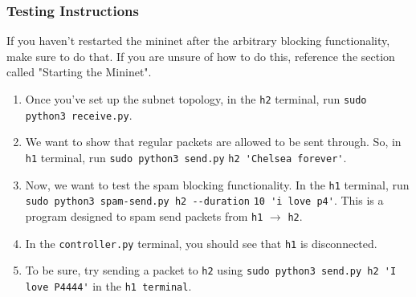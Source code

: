 \subsubsection{Testing Instructions}
If you haven't restarted the mininet after the arbitrary blocking functionality, make sure to do that. If you are unsure of how to do this, reference the section called "Starting the Mininet".
\begin{enumerate}
    \item Once you've set up the subnet topology, in the \verb|h2| terminal, run \verb|sudo python3 receive.py|.
    \item We want to show that regular packets are allowed to be sent through. So, in \verb|h1| terminal, run \verb|sudo python3 send.py| \verb|h2 'Chelsea forever'|. 
    \item Now, we want to test the spam blocking functionality. In the \verb|h1| terminal, run \verb|sudo python3 spam-send.py h2 --duration| \verb|10 'i love p4'|. This is a program designed to spam send packets from \verb|h1| $\rightarrow$ \verb|h2|.
    \item In the \verb|controller.py| terminal, you should see that \verb|h1| is disconnected.
    \item To be sure, try sending a packet to \verb|h2| using \verb|sudo python3 send.py h2 'I love P4444'| in the \verb|h1 terminal|.
\end{enumerate}
